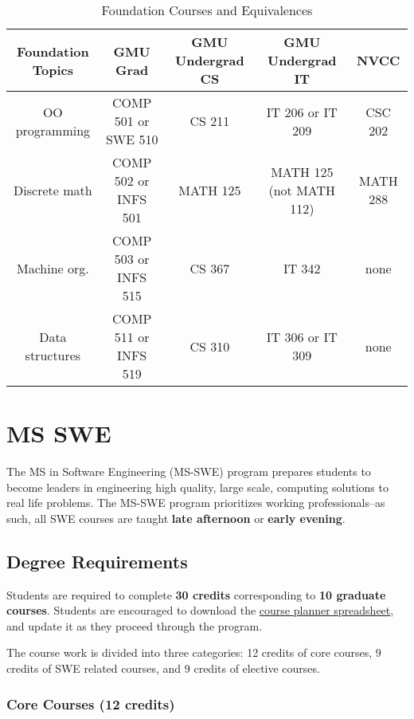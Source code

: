 \documentclass[oneside,11pt]{memoir}
\begin{document}
\begin{table}[]
    \centering
    \footnotesize
    \begin{tabular}{c|c|c|c|c}
      Foundation Topics   & GMU Grad  &	GMU Undergrad CS &	GMU Undergrad IT &	NVCC\\
      \midrule
      OO programming & 	COMP 501 or SWE 510 & 	CS 211 & 	IT 206 or IT 209 &	CSC 202\\
      Discrete math              &	COMP 502 or INFS 501 & 	MATH 125 & 	MATH 125 (not MATH 112) & 	MATH 288\\
      Machine org. 	& COMP 503 or INFS 515 &	CS 367 	&IT 342 	& none\\
      Data structures &	COMP 511 or INFS 519 &	CS 310 	& IT 306 or IT 309 &	none\\
    \end{tabular}
    \caption{Foundation Courses and Equivalences}
    \label{tab:foundation-courses}
\end{table}


\chapter{MS SWE}


The MS in Software Engineering (MS-SWE) program prepares students to become leaders in engineering high quality, large scale, computing solutions to real life problems. The MS-SWE program prioritizes working professionals--as such, all SWE courses are taught \textbf{late afternoon} or \textbf{early evening}.

\section{Degree Requirements}

Students are required to complete \textbf{30 credits} corresponding to \textbf{10 graduate courses}. Students are encouraged to download the \href{https://cs.gmu.edu/media/uploads/programs/graduate/masters/ms-swe-courseplanner.xlsx}{course planner spreadsheet}, and update it as they proceed through the program.

The course work is divided into three categories: 12 credits of core courses, 9 credits of SWE related courses, and 9 credits of elective courses.

\subsection{Core Courses (12 credits)}
\end{document}
